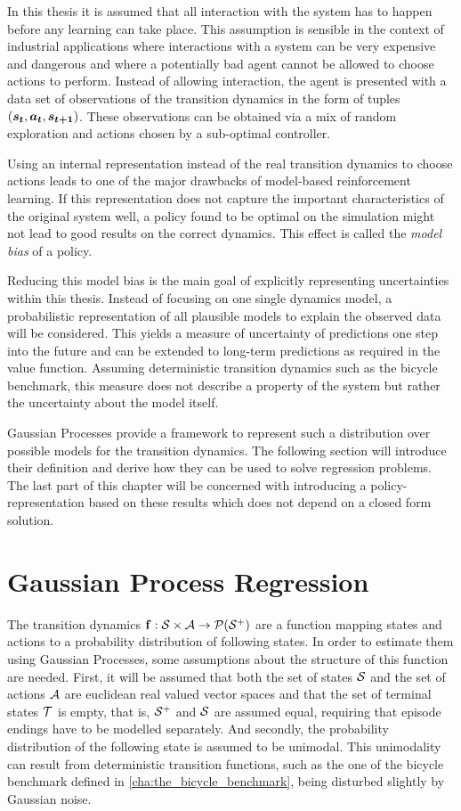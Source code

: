 In this thesis it is assumed that all interaction with the system has to happen before any learning can take place.
This assumption is sensible in the context of industrial applications where interactions with a system can be very expensive and dangerous and where a potentially bad agent cannot be allowed to choose actions to perform.
Instead of allowing interaction, the agent is presented with a data set of observations of the transition dynamics in the form of tuples $(\bm{s_t}, \bm{a_t}, \bm{s_{t+1}})$.
These observations can be obtained via a mix of random exploration and actions chosen by a sub-optimal controller.

Using an internal representation instead of the real transition dynamics to choose actions leads to one of the major drawbacks of model-based reinforcement learning.
If this representation does not capture the important characteristics of the original system well, a policy found to be optimal on the simulation might not lead to good results on the correct dynamics.
This effect is called the \emph{model bias} of a policy.

Reducing this model bias is the main goal of explicitly representing uncertainties within this thesis.
Instead of focusing on one single dynamics model, a probabilistic representation of all plausible models to explain the observed data will be considered.
This yields a measure of uncertainty of predictions one step into the future and can be extended to long-term predictions as required in the value function.
Assuming deterministic transition dynamics such as the bicycle benchmark, this measure does not describe a property of the system but rather the uncertainty about the model itself.

Gaussian Processes provide a framework to represent such a distribution over possible models for the transition dynamics.
The following section will introduce their definition and derive how they can be used to solve regression problems.
The last part of this chapter will be concerned with introducing a policy-representation based on these results which does not depend on a closed form solution.

\section{Gaussian Process Regression}
\label{sec:gp_regression}
The transition dynamics $\operatorname{\mathbf{f}} : \mathcal{S} \times \mathcal{A} \to \operatorname{\mathcal{P}}(\mathcal{S}^+)$ are a function mapping states and actions to a probability distribution of following states.
In order to estimate them using Gaussian Processes, some assumptions about the structure of this function are needed.
First, it will be assumed that both the set of states $\mathcal{S}$ and the set of actions $\mathcal{A}$ are euclidean real valued vector spaces and that the set of terminal states $\mathcal{T}$ is empty, that is, $\mathcal{S}^+$ and $\mathcal{S}$ are assumed equal, requiring that episode endings have to be modelled separately.
And secondly, the probability distribution of the following state is assumed to be unimodal.
This unimodality can result from deterministic transition functions, such as the one of the bicycle benchmark defined in \cref{cha:the_bicycle_benchmark}, being disturbed slightly by Gaussian noise.

